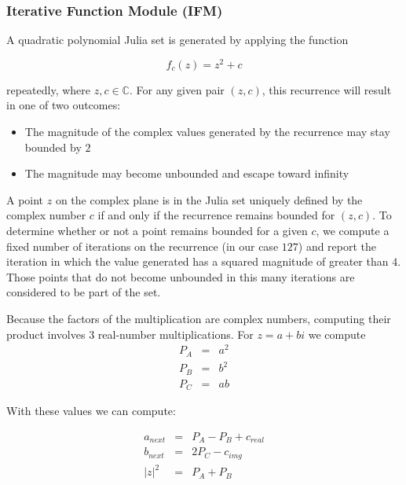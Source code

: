 \documentclass{article}
\begin{document}
\subsubsection{Iterative Function Module (IFM)}

A quadratic polynomial Julia set is generated by applying the function

\begin{equation}
f_c(z) = z^2 + c
\end{equation}

repeatedly, where $z,c \in \mathbb{C}$. For any given pair $(z, c)$, this recurrence will result in one of two outcomes:
\begin{itemize}
\item The magnitude of the complex values generated by the recurrence may stay bounded by $2$
\item The magnitude may become unbounded and escape toward infinity
\end{itemize}

A point $z$ on the complex plane is in the Julia set uniquely defined by the complex number $c$ if and only if the 
recurrence remains bounded for $(z, c)$. To determine whether or not a point remains bounded for a given $c$, we compute
a fixed number of iterations on the recurrence (in our case $127$) and report the iteration in which the value generated has
a squared magnitude of greater than $4$. Those points that do not become unbounded in this many iterations are considered
to be part of the set.

Because the factors of the multiplication are complex numbers, computing their product involves
$3$ real-number multiplications. For $z = a + bi$ we compute\\

\begin{eqnarray}
P_A &=& a^2 \nonumber \\
P_B &=& b^2 \nonumber \\
P_C &=& ab \nonumber
\end{eqnarray}

With these values we can compute:

\begin{eqnarray}
a_{next} &=& P_A - P_B + c_{real}\nonumber \\
b_{next} &=& 2P_C - c_{img} \nonumber \\
|z|^2 &=& P_A + P_B \nonumber 
\end{eqnarray}
\end{document}
